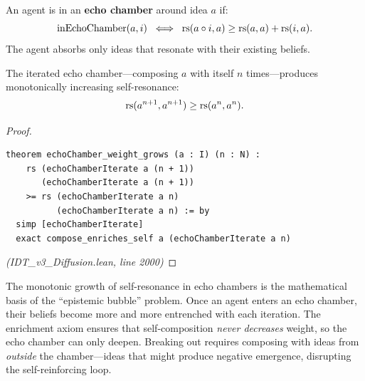 \begin{definition}
\label{def:echo-chamber}
An agent is in an \textbf{echo chamber} around idea $a$ if:
\[
  \mathrm{inEchoChamber}(a, i) \;\iff\; \mathrm{rs}(a \circ i, a) \geq \mathrm{rs}(a, a) + \mathrm{rs}(i, a).
\]
The agent absorbs only ideas that resonate with their existing beliefs.
\end{definition}

\begin{theorem}
\label{thm:echo-chamber-iterate}
The iterated echo chamber---composing $a$ with itself $n$ times---produces
monotonically increasing self-resonance:
\[
  \mathrm{rs}(a^{n+1}, a^{n+1}) \geq \mathrm{rs}(a^n, a^n).
\]
\end{theorem}

\begin{proof}
\begin{lstlisting}
theorem echoChamber_weight_grows (a : I) (n : N) :
    rs (echoChamberIterate a (n + 1))
       (echoChamberIterate a (n + 1))
    >= rs (echoChamberIterate a n)
          (echoChamberIterate a n) := by
  simp [echoChamberIterate]
  exact compose_enriches_self a (echoChamberIterate a n)
\end{lstlisting}
\textit{(IDT\_v3\_Diffusion.lean, line 2000)}
\end{proof}

\begin{interpretation}
The monotonic growth of self-resonance in echo chambers is the mathematical
basis of the ``epistemic bubble'' problem. Once an agent enters an echo chamber,
their beliefs become more and more entrenched with each iteration. The enrichment
axiom ensures that self-composition \emph{never decreases} weight, so the echo
chamber can only deepen. Breaking out requires composing with ideas from
\emph{outside} the chamber---ideas that might produce negative emergence,
disrupting the self-reinforcing loop.
\end{interpretation}

